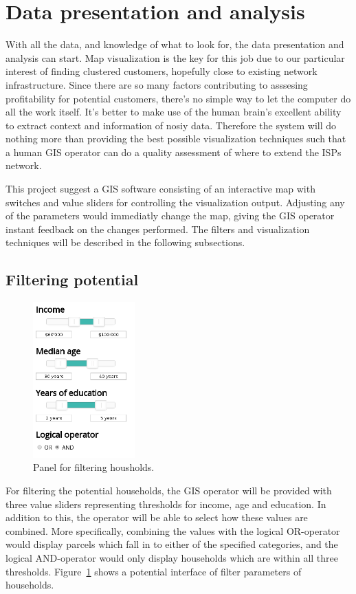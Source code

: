 \documentclass[twocolumn]{article}
\begin{document}
\section{Data presentation and analysis}
\label{sec:Methods}
With all the data, and knowledge of what to look for, the data presentation and analysis can start. Map visualization is the key for this job due to our particular interest of finding clustered customers, hopefully close to existing network infrastructure. Since there are so many factors contributing to asssesing profitability for potential customers, there's no simple way to let the computer do all the work itself. It's better to make use of the human brain's excellent ability to extract context and information of nosiy data. Therefore the system will do nothing more than providing the best possible visualization techniques such that a human GIS operator can do a quality assessment of where to extend the ISPs network.

This project suggest a GIS software consisting of an interactive map with switches and value sliders for controlling the visualization output. Adjusting any of the parameters would immediatly change the map, giving the GIS operator instant feedback on the changes performed. The filters and visualization techniques will be described in the following subsections.

\subsection{Filtering potential}
\label{sub:Filtering potential}
\begin{figure}
  \centering
  \includegraphics[width=0.35\textwidth]{img/household.png}
  \caption{Panel for filtering housholds.}
  \label{fig:household}
\end{figure}
For filtering the potential households, the GIS operator will be provided with three value sliders representing thresholds for income, age and education. In addition to this, the operator will be able to select how these values are combined. More specifically, combining the values with the logical OR-operator would display parcels which fall in to either of the specified categories, and the logical AND-operator would only display households which are within all three thresholds. Figure~\ref{fig:household} shows a potential interface of filter parameters of households.
\end{document}
